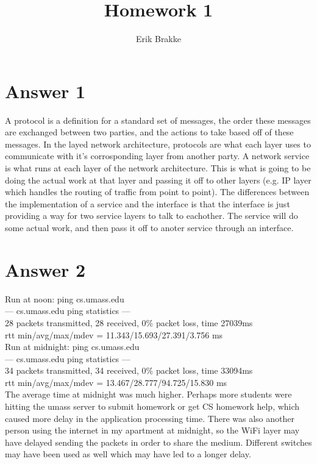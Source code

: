 \documentclass[11pt]{article}
\theoremstyle{definition}
\begin{document}
\title{Homework 1}
\author{Erik Brakke}
\maketitle

\thispagestyle{fancy}
 
 
\section*{Answer 1}
A protocol is a definition for a standard set of messages, the order these messages are exchanged between two parties, and the actions to take based off of these messages.  In the layed network architecture, protocols are what each layer uses to communicate with it's corrosponding layer from another party.  A network service is what runs at each layer of the network architecture.  This is what is going to be doing the actual work at that layer and passing it off to other layers (e.g. IP layer which handles the routing of traffic from point to point).  The differences between the implementation of a service and the interface is that the interface is just providing a way for two service layers to talk to eachother.  The service will do some actual work, and then pass it off to anoter service through an interface.  

\section*{Answer 2}
Run at noon: ping cs.umass.edu\\
--- cs.umass.edu ping statistics ---\\
28 packets transmitted, 28 received, 0\% packet loss, time 27039ms\\
rtt min/avg/max/mdev = 11.343/15.693/27.391/3.756 ms\\

Run at midnight: ping cs.umass.edu\\
--- cs.umass.edu ping statistics ---\\
34 packets transmitted, 34 received, 0\% packet loss, time 33094ms\\
rtt min/avg/max/mdev = 13.467/28.777/94.725/15.830 ms\\

The average time at midnight was much higher.  Perhaps more students were hitting the umass server to submit homework or get CS homework help, which caused more delay in the application processing time.  There was also another person using the internet in my apartment at midnight, so the WiFi layer may have delayed sending the packets in order to share the medium.  Different switches may have been used as well which may have led to a longer delay.
\end{document}
